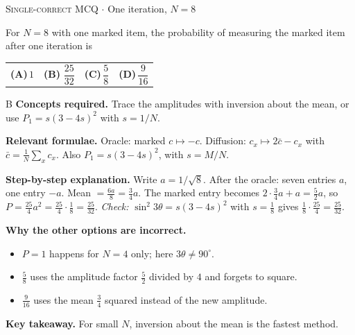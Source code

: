 \documentclass[11pt,a4paper]{article}
\newcommand{\optlabel}[1]{\textbf{(#1)}}
\newcommand{\correctlabel}[1]{\textcolor{okgreen}{\textbf{(#1)}\,\ding{51}}}
\newenvironment{qitem}[1]{\begin{list}{}{\setlength{\leftmargin}{3.3em}\setlength{\labelwidth}{3.1em}%
  \setlength{\labelsep}{0.2em}\setlength{\topsep}{3pt}\setlength{\parsep}{3pt}}\item[\textbf{Q.#1}\hfill]}{\end{list}}
\newcommand{\qsep}{\par\vspace{2pt}{\color{black!15}\hrule}\vspace{4pt}}
\newcommand{\qmeta}[2]{{\footnotesize\color{black!60}\textsc{#1} \;$\cdot$\; #2}\par}
\begin{document}
\begin{qitem}{42}
\qmeta{Single-correct MCQ}{One iteration, $N = 8$}
For $N = 8$ with one marked item, the probability of measuring the marked item after one iteration is
\par\smallskip\noindent\begin{tabularx}{\linewidth}{@{}*{4}{L}@{}}
\optlabel{A}\,$1$ & \correctlabel{B}\,$\dfrac{25}{32}$ & \optlabel{C}\,$\dfrac58$ & \optlabel{D}\,$\dfrac{9}{16}$
\end{tabularx}
\end{qitem}
\begin{solbox}{B}
\textbf{\color{brand}Concepts required.} Trace the amplitudes with inversion about the mean, or use $P_1 = s(3 - 4s)^2$ with $s = 1/N$.

\textbf{\color{brand}Relevant formulae.} Oracle: marked $c \mapsto -c$. Diffusion: $c_x \mapsto 2\bar c - c_x$ with $\bar c = \frac1N\sum_xc_x$. Also $P_1 = s(3 - 4s)^2$, with $s = M/N$.

\textbf{\color{brand}Step-by-step explanation.} Write $a = 1/\sqrt8$. After the oracle: seven entries $a$, one entry $-a$. Mean $= \frac{6a}{8} = \frac34a$. The marked entry becomes $2\cdot\frac34a + a = \frac52a$, so
$P = \frac{25}{4}a^2 = \frac{25}{4}\cdot\frac18 = \frac{25}{32}$. \emph{Check:} $\sin^2 3\theta = s(3 - 4s)^2$ with $s = \frac18$ gives $\frac18\cdot\frac{25}{4} = \frac{25}{32}$.

\textbf{\color{brand}Why the other options are incorrect.}
\begin{itemize}[leftmargin=2.4em, itemsep=1pt, topsep=2pt]
\item[\textbf{(A)}] $P = 1$ happens for $N = 4$ only; here $3\theta \ne 90^\circ$.
\item[\textbf{(C)}] $\frac58$ uses the amplitude factor $\frac52$ divided by $4$ and forgets to square.
\item[\textbf{(D)}] $\frac{9}{16}$ uses the mean $\frac34$ squared instead of the new amplitude.
\end{itemize}
\textbf{\color{brand}Key takeaway.} For small $N$, inversion about the mean is the fastest method.
\end{solbox}
\qsep
\end{document}
